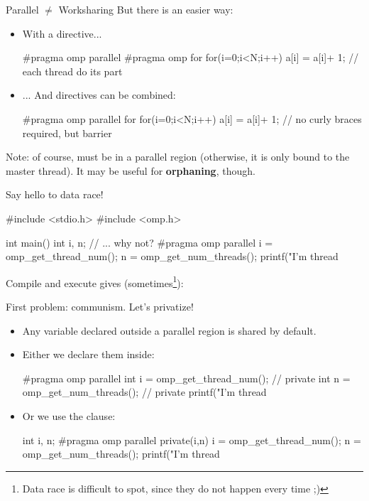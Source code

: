 \begin{frame}[fragile]{Parallel $\neq$ Worksharing}
	But there is an easier way:
	\begin{itemize}
		\item With a directive...\begin{ccode}
#pragma omp parallel
{
	#pragma omp for
	for(i=0;i<N;i++)
		a[i] = a[i]+ 1;
} // each thread do its part
		\end{ccode}
		\item ... And directives can be combined:\begin{ccode}
#pragma omp parallel for
for(i=0;i<N;i++)
	a[i] = a[i]+ 1; // no curly braces required, but barrier
		\end{ccode}
	\end{itemize}
	Note: of course,  must be in a parallel region (otherwise, it is only bound to the master thread). It may be useful for \textbf{orphaning}, though.
\end{frame}

\begin{frame}[fragile]{Say hello to data race!}
	\begin{ccode}
#include <stdio.h>
#include <omp.h>

int main() {
	int i, n; // ... why not?
	#pragma omp parallel
	{
		i = omp_get_thread_num(); n = omp_get_num_threads();
		printf("I'm thread %
	}
}
	\end{ccode}
	Compile and execute gives (sometimes\footnote{Data race is difficult to spot, since they do not happen every time ;)}):
\end{frame}

\begin{frame}[fragile]{First problem: communism. Let's privatize!}
	\begin{itemize}
		\item Any variable declared outside a parallel region is shared by default.
		\item Either we declare them inside:\begin{ccode}
#pragma omp parallel
{
	int i = omp_get_thread_num(); // private
	int n = omp_get_num_threads(); // private
	printf("I'm thread %
}
		\end{ccode}
		\item Or we use the  clause:\begin{ccode}
int i, n;
#pragma omp parallel private(i,n)
{
	i = omp_get_thread_num();
	n = omp_get_num_threads();
	printf("I'm thread %
}
		\end{ccode}
	\end{itemize}
\end{frame}

